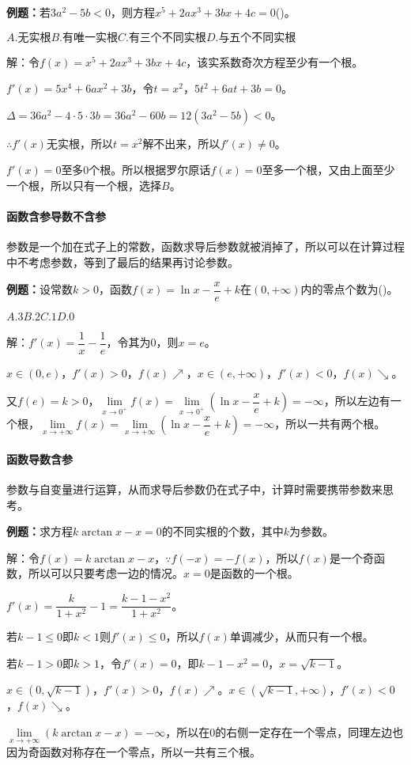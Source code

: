 \documentclass[UTF8, 12pt]{ctexart}
\begin{document}
\textbf{例题：}若$3a^2-5b<0$，则方程$x^5+2ax^3+3bx+4c=0$()。

$A.\text{无实根}$\qquad$B.\text{有唯一实根}$\qquad$C.\text{有三个不同实根}$\qquad$D.\text{与五个不同实根}$

解：令$f(x)=x^5+2ax^3+3bx+4c$，该实系数奇次方程至少有一个根。

$f'(x)=5x^4+6ax^2+3b$，令$t=x^2$，$5t^2+6at+3b=0$。

$\Delta=36a^2-4\cdot5\cdot3b=36a^2-60b=12(3a^2-5b)<0$。

$\therefore f'(x)$无实根，所以$t=x^2$解不出来，所以$f'(x)\neq0$。

$f'(x)=0$至多0个根。所以根据罗尔原话$f(x)=0$至多一个根，又由上面至少一个根，所以只有一个根，选择$B$。

\paragraph{函数含参导数不含参} \leavevmode \medskip

参数是一个加在式子上的常数，函数求导后参数就被消掉了，所以可以在计算过程中不考虑参数，等到了最后的结果再讨论参数。

\textbf{例题：}设常数$k>0$，函数$f(x)=\ln x-\dfrac{x}{e}+k$在$(0,+\infty)$内的零点个数为()。

$A.3$\qquad$B.2$\qquad$C.1$\qquad$D.0$

解：$f'(x)=\dfrac{1}{x}-\dfrac{1}{e}$，令其为0，则$x=e$。

$x\in(0,e)$，$f'(x)>0$，$f(x)\nearrow$，$x\in(e,+\infty)$，$f'(x)<0$，$f(x)\searrow$。

又$f(e)=k>0$，$\lim\limits_{x\to0^+}f(x)=\lim\limits_{x\to0^+}(\ln x-\dfrac{x}{e}+k)=-\infty$，所以左边有一个根，$\lim\limits_{x\to+\infty}f(x)=\lim\limits_{x\to+\infty}(\ln x-\dfrac{x}{e}+k)=-\infty$，所以一共有两个根。

\paragraph{函数导数含参} \leavevmode \medskip

参数与自变量进行运算，从而求导后参数仍在式子中，计算时需要携带参数来思考。

\textbf{例题：}求方程$k\arctan x-x=0$的不同实根的个数，其中$k$为参数。

解：令$f(x)=k\arctan x-x$$，\because f(-x)=-f(x)$，所以$f(x)$是一个奇函数，所以可以只要考虑一边的情况。$x=0$是函数的一个根。

$f'(x)=\dfrac{k}{1+x^2}-1=\dfrac{k-1-x^2}{1+x^2}$。

若$k-1\leqslant0$即$k<1$则$f'(x)\leqslant0$，所以$f(x)$单调减少，从而只有一个根。

若$k-1>0$即$k>1$，令$f'(x)=0$，即$k-1-x^2=0$，$x=\sqrt{k-1}$。

$x\in(0,\sqrt{k-1})$，$f'(x)>0$，$f(x)\nearrow$。$x\in(\sqrt{k-1},+\infty)$，$f'(x)<0$，$f(x)\searrow$。

$\lim\limits_{x\to+\infty}(k\arctan x-x)=-\infty$，所以在0的右侧一定存在一个零点，同理左边也因为奇函数对称存在一个零点，所以一共有三个根。
\end{document}
